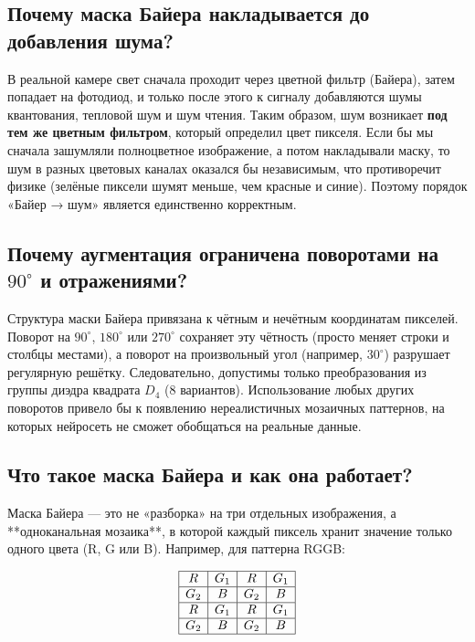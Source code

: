 \documentclass[12pt,a4paper]{article}
\begin{document}
\subsection{Почему маска Байера накладывается до добавления шума?}

В реальной камере свет сначала проходит через цветной фильтр (Байера), затем попадает на фотодиод, и только после этого к сигналу добавляются шумы квантования, тепловой шум и шум чтения. Таким образом, шум возникает \textbf{под тем же цветным фильтром}, который определил цвет пикселя. Если бы мы сначала зашумляли полноцветное изображение, а потом накладывали маску, то шум в разных цветовых каналах оказался бы независимым, что противоречит физике (зелёные пиксели шумят меньше, чем красные и синие). Поэтому порядок «Байер → шум» является единственно корректным.

\subsection{Почему аугментация ограничена поворотами на $90^\circ$ и отражениями?}

Структура маски Байера привязана к чётным и нечётным координатам пикселей. Поворот на $90^\circ$, $180^\circ$ или $270^\circ$ сохраняет эту чётность (просто меняет строки и столбцы местами), а поворот на произвольный угол (например, $30^\circ$) разрушает регулярную решётку. Следовательно, допустимы только преобразования из группы диэдра квадрата $D_4$ (8 вариантов). Использование любых других поворотов привело бы к появлению нереалистичных мозаичных паттернов, на которых нейросеть не сможет обобщаться на реальные данные.

\subsection{Что такое маска Байера и как она работает?}

Маска Байера — это не «разборка» на три отдельных изображения, а **одноканальная мозаика**, в которой каждый пиксель хранит значение только одного цвета (R, G или B). Например, для паттерна RGGB:

\[
\begin{array}{|c|c|c|c|}
\hline
R & G_1 & R & G_1 \\
\hline
G_2 & B & G_2 & B \\
\hline
R & G_1 & R & G_1 \\
\hline
G_2 & B & G_2 & B \\
\hline
\end{array}
\]
\end{document}

